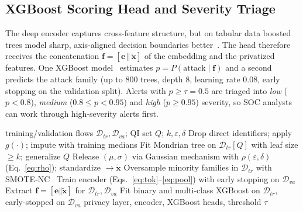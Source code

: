 \subsection{XGBoost Scoring Head and Severity Triage}
\label{sec:head}
The deep encoder captures cross-feature structure, but on tabular data
boosted trees model sharp, axis-aligned decision boundaries better~\cite{grinsztajn2022tree}.
The head therefore receives the concatenation
$\mathbf{f}=[\mathbf{e}\,\Vert\,\tilde{\mathbf{x}}]$ of the embedding and the
privatized features. One XGBoost model~\cite{chen2016xgboost} estimates
$p=P(\text{attack}\mid\mathbf{f})$ and a second predicts the attack family
(up to 800 trees, depth 8, learning rate 0.08, early stopping on the
validation split). Alerts with $p\ge\tau=0.5$ are triaged into
\emph{low} ($p<0.8$), \emph{medium} ($0.8\le p<0.95$) and \emph{high}
($p\ge0.95$) severity, so SOC analysts can work through high-severity alerts first.

\begin{algorithm}[t]
\caption{HALX training}
\label{alg:halx}
\begin{algorithmic}[1]
\REQUIRE training/validation flows $\mathcal{D}_{tr},\mathcal{D}_{va}$; QI set $Q$; $k,\varepsilon,\delta$
\STATE Drop direct identifiers; apply $g(\cdot)$; impute with training medians
\STATE Fit Mondrian tree on $\mathcal{D}_{tr}[Q]$ with leaf size $\ge k$; generalize $Q$
\STATE Release $(\mu,\sigma)$ via Gaussian mechanism with $\rho(\varepsilon,\delta)$ (Eq.~\ref{eq:rho}); standardize $\to\tilde{\mathbf{x}}$
\STATE Oversample minority families in $\mathcal{D}_{tr}$ with SMOTE-NC~\cite{chawla2002smote}
\STATE Train encoder (Eqs.~\ref{eq:tok}--\ref{eq:pool}) with early stopping on $\mathcal{D}_{va}$
\STATE Extract $\mathbf{f}=[\mathbf{e}\Vert\tilde{\mathbf{x}}]$ for $\mathcal{D}_{tr},\mathcal{D}_{va}$
\STATE Fit binary and multi-class XGBoost on $\mathcal{D}_{tr}$, early-stopped on $\mathcal{D}_{va}$
\RETURN privacy layer, encoder, XGBoost heads, threshold $\tau$
\end{algorithmic}
\end{algorithm}
